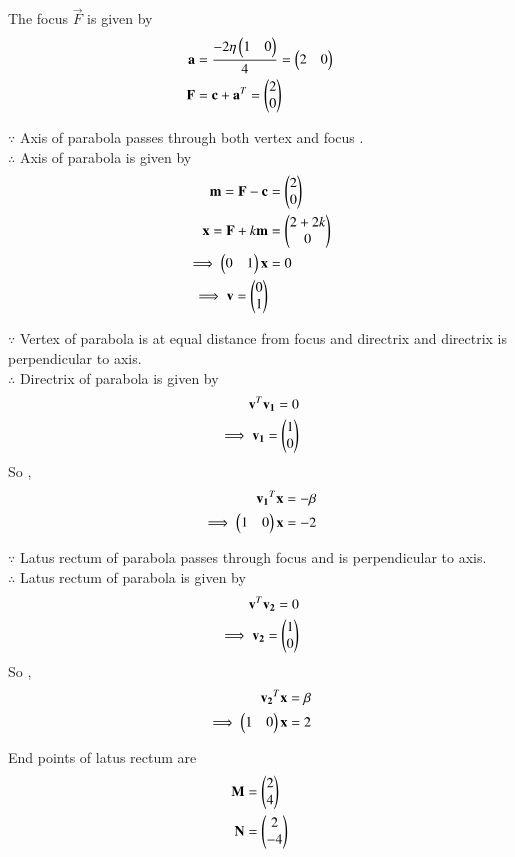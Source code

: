 \documentclass[journal,12pt,twocolumn]{IEEEtran}
\begin{document}
The focus $\vec{F}$ is given by
\begin{align}
\mathbf{a} &= \frac{-2\eta\begin{pmatrix}1 & 0\end{pmatrix}}{4} = \begin{pmatrix}2 & 0\end{pmatrix}
\\
\mathbf{F} &= \mathbf{c} + \mathbf{a}^T = \begin{pmatrix}2\\0\end{pmatrix}
\end{align}

$\because$
Axis of parabola passes through both vertex and focus .
\\
$\therefore$
Axis of parabola is given by
\begin{align}
\mathbf{m} =\mathbf{F} - \mathbf{c} &= \begin{pmatrix}2\\0\end{pmatrix}
\\
\mathbf{x} = \mathbf{F} + k\mathbf{m} &= \begin{pmatrix}2+2k \\ 0\end{pmatrix}
\\
\implies \begin{pmatrix}0 & 1\end{pmatrix}\mathbf{x} &= 0
\\
\implies \mathbf{v} = \begin{pmatrix}0 \\ 1\end{pmatrix}
\end{align}

$\because$
Vertex of parabola is at equal distance from focus and directrix and directrix is perpendicular to axis.
\\
$\therefore$
Directrix of parabola is given by
\begin{align}
\mathbf{v}^T\mathbf{v_1} = 0
\\
\implies \mathbf{v_1} = \begin{pmatrix}1 \\ 0\end{pmatrix}
\end{align}
So , 
\begin{align}
\mathbf{v_1}^T\mathbf{x} = -\beta
\\
\implies \begin{pmatrix}1 & 0\end{pmatrix}\mathbf{x} = -2
\end{align}

$\because$
Latus rectum of parabola passes through focus and is perpendicular to axis.
\\
$\therefore$
Latus rectum of parabola is given by
\begin{align}
\mathbf{v}^T\mathbf{v_2} = 0
\\
\implies \mathbf{v_2} = \begin{pmatrix}1 \\ 0\end{pmatrix}
\end{align}
So , 
\begin{align}
\mathbf{v_2}^T\mathbf{x} = \beta
\\
\implies \begin{pmatrix}1 & 0\end{pmatrix}\mathbf{x} = 2
\end{align}

End points of latus rectum are
\begin{align}
\mathbf{M} &= \begin{pmatrix}2\\4\end{pmatrix}
\\
\mathbf{N} &= \begin{pmatrix}2\\-4\end{pmatrix}
\end{align}
\end{document}
